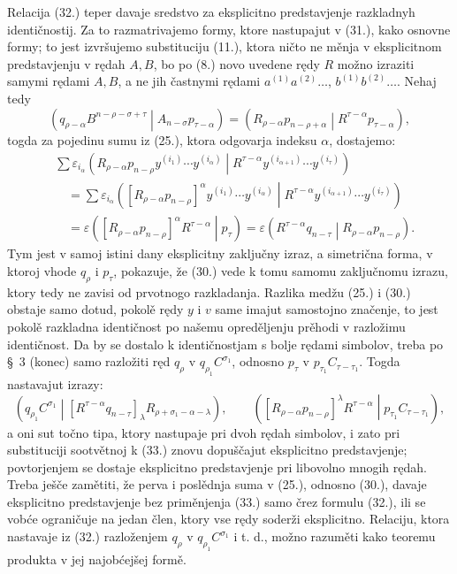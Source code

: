 \documentclass[11pt]{article}
\newcommand{\pair}[2]{\left(#1\middle|#2\right)}
\newcommand{\eps}{\varepsilon}
\begin{document}
Relacija (32.) teper davaje sredstvo za eksplicitno predstavjenje razkladnyh identičnostij. Za to razmatrivajemo formy, ktore nastupajut v (31.), kako osnovne formy; to jest izvršujemo substituciju (11.), ktora ničto ne měnja v eksplicitnom predstavjenju v rędah $A,B$, bo po (8.) novo uvedene rędy $R$ možno izraziti samymi rędami $A,B$, a ne jih častnymi rędami $a^{(1)}a^{(2)}\ldots$, $b^{(1)}b^{(2)}\ldots$. Nehaj tedy
\begin{equation}
 \pair{q_{\rho-\alpha}B^{n-\rho-\sigma+\tau}}{A_{n-\sigma}p_{\tau-\alpha}}
 =\pair{R_{\rho-\alpha}p_{n-\rho+\alpha}}{R^{\tau-\alpha}p_{\tau-\alpha}},
\tag{33}
\end{equation}
togda za pojedinu sumu iz (25.), ktora odgovarja indeksu $\alpha$, dostajemo:
\begin{equation}
\begin{aligned}
&\sum \eps_{i_\alpha}
\pair{R_{\rho-\alpha}p_{n-\rho}y^{(i_1)}\cdots y^{(i_\alpha)}}
{R^{\tau-\alpha}y^{(i_{\alpha+1})}\cdots y^{(i_\tau)}}\\
&\quad=\sum \eps_{i_\alpha}
\pair{[R_{\rho-\alpha}p_{n-\rho}]^\alpha
y^{(i_1)}\cdots y^{(i_\alpha)}}
{R^{\tau-\alpha}y^{(i_{\alpha+1})}\cdots y^{(i_\tau)}}\\
&\quad=\eps\pair{[R_{\rho-\alpha}p_{n-\rho}]^\alpha R^{\tau-\alpha}}{p_\tau}
 =\eps\pair{R^{\tau-\alpha}q_{n-\tau}}{R_{\rho-\alpha}p_{n-\rho}}.
\end{aligned}
\tag{34}
\end{equation}
Tym jest v samoj istini dany eksplicitny zaključny izraz, a simetrična forma, v ktoroj vhode $q_\rho$ i $p_\tau$, pokazuje, že (30.) vede k tomu samomu zaključnomu izrazu, ktory tedy ne zavisi od prvotnogo razkladanja. Razlika medžu (25.) i (30.) obstaje samo dotud, pokolě rędy $y$ i $v$ same imajut samostojno značenje, to jest pokolě razkladna identičnost po našemu opreděljenju prěhodi v razložimu identičnost. Da by se dostalo k identičnostjam s bolje rędami simbolov, treba po \S\ 3 (konec) samo razložiti ręd $q_\rho$ v $q_{\rho_1}C^{\sigma_1}$, odnosno $p_\tau$ v $p_{\tau_1}C_{\tau-\tau_1}$. Togda nastavajut izrazy:
\begin{equation}
 \pair{q_{\rho_1}C^{\sigma_1}}
 {[R^{\tau-\alpha}q_{n-\tau}]_\lambda R_{\rho+\sigma_1-\alpha-\lambda}},
 \qquad
 \pair{[R_{\rho-\alpha}p_{n-\rho}]^\lambda R^{\tau-\alpha}}
 {p_{\tau_1}C_{\tau-\tau_1}},
\tag{35}
\end{equation}
a oni sut točno tipa, ktory nastupaje pri dvoh rędah simbolov, i zato pri substituciji sootvětnoj k (33.) znovu dopuščajut eksplicitno predstavjenje; povtorjenjem se dostaje eksplicitno predstavjenje pri libovolno mnogih rędah. Treba ješče zamětiti, že perva i poslědnja suma v (25.), odnosno (30.), davaje eksplicitno predstavjenje bez priměnjenja (33.) samo črez formulu (32.), ili se vobće ograničuje na jedan člen, ktory vse rędy soderži eksplicitno. Relaciju, ktora nastavaje iz (32.) razloženjem $q_\rho$ v $q_{\rho_1}C^{\sigma_1}$ i t. d., možno razuměti kako teoremu produkta v jej najobćejšej formě.
\end{document}
